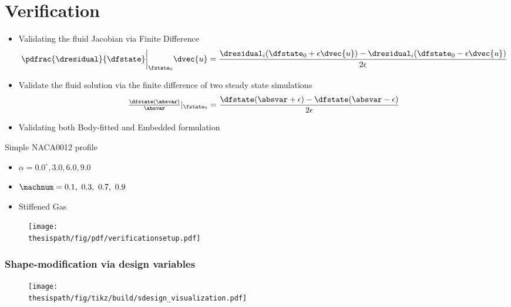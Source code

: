 \section{Verification}


\begin{frame}

\begin{itemize}
\item Validating the fluid Jacobian via Finite Difference
\begin{align*}
\pdfrac{\dresidual}{\dfstate}\bigg\rvert_{\fstate_0}\dvec{u}=\frac{\dresidual_i(\dfstate_0+\epsilon\dvec{u})-\dresidual_i(\dfstate_0-\epsilon\dvec{u})}{2\epsilon}
\end{align*}
\item Validate the fluid solution via the finite difference of two steady state simulations
\begin{align*}
\tfrac{\dfstate(\absvar)}{\absvar}\rvert_{\fstate_0}=\frac{\dfstate(\absvar+\epsilon)-\dfstate(\absvar-\epsilon)}{2 \epsilon}
\end{align*}
\item Validating both Body-fitted and Embedded formulation
\end{itemize}
\end{frame}



\begin{frame}
Simple NACA0012 profile

\begin{itemize}
\item $\alpha=0.0^{\circ}, 3.0, 6.0, 9.0$
\item $\machnum=0.1,~0.3,~0.7,~0.9$
\item Stiffened Gas
\end{itemize}
\begin{figure}
\texttt{[image: \\thesispath/fig/pdf/verificationsetup.pdf]}
\end{figure}

\end{frame}



\begin{frame}
\frametitle{Shape-modification via design variables}
\begin{figure}
\texttt{[image: \\thesispath/fig/tikz/build/sdesign\_visualization.pdf]}
\end{figure}
\end{frame}

